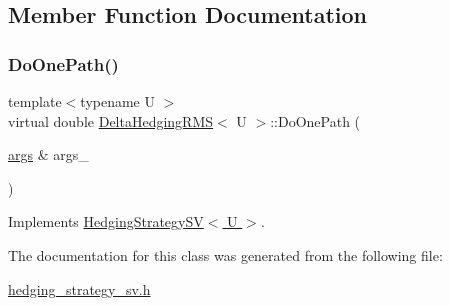 \subsection{Member Function Documentation}
\hypertarget{classDeltaHedgingRMS_ad1dfe5625f1064b9b1f8a45b20f0ee50}{}\label{classDeltaHedgingRMS_ad1dfe5625f1064b9b1f8a45b20f0ee50} 
\subsubsection{\texorpdfstring{Do\+One\+Path()}{DoOnePath()}}
{\footnotesize\ttfamily template$<$typename U $>$ \\
virtual double \hyperlink{classDeltaHedgingRMS}{Delta\+Hedging\+R\+MS}$<$ U $>$\+::Do\+One\+Path (\begin{DoxyParamCaption}\item[{\hyperlink{path__generation_8h_a75c13cde2074f502cc4348c70528572d}{args} \&}]{args\+\_\+ }\end{DoxyParamCaption})\hspace{0.3cm}{\ttfamily [virtual]}}



Implements \hyperlink{classHedgingStrategySV_abb9531c069f4d1e758fc23c4bc7ed09c}{Hedging\+Strategy\+S\+V$<$ U $>$}.



The documentation for this class was generated from the following file\+:\begin{DoxyCompactItemize}
\item 
\hyperlink{hedging__strategy__sv_8h}{hedging\+\_\+strategy\+\_\+sv.\+h}\end{DoxyCompactItemize}
